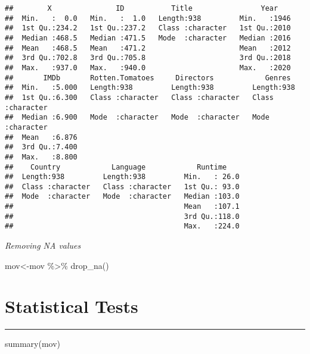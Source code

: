 \documentclass[
]{article}
\newenvironment{Shaded}{\begin{snugshade}}{\end{snugshade}}
\newcommand{\FunctionTok}[1]{\textcolor[rgb]{0.00,0.00,0.00}{#1}}
\newcommand{\NormalTok}[1]{#1}
\newcommand{\OtherTok}[1]{\textcolor[rgb]{0.56,0.35,0.01}{#1}}
\newcommand{\SpecialCharTok}[1]{\textcolor[rgb]{0.00,0.00,0.00}{#1}}
\begin{document}
\begin{verbatim}
##        X               ID           Title                Year     
##  Min.   :  0.0   Min.   :  1.0   Length:938         Min.   :1946  
##  1st Qu.:234.2   1st Qu.:237.2   Class :character   1st Qu.:2010  
##  Median :468.5   Median :471.5   Mode  :character   Median :2016  
##  Mean   :468.5   Mean   :471.2                      Mean   :2012  
##  3rd Qu.:702.8   3rd Qu.:705.8                      3rd Qu.:2018  
##  Max.   :937.0   Max.   :940.0                      Max.   :2020  
##       IMDb       Rotten.Tomatoes     Directors            Genres         
##  Min.   :5.000   Length:938         Length:938         Length:938        
##  1st Qu.:6.300   Class :character   Class :character   Class :character  
##  Median :6.900   Mode  :character   Mode  :character   Mode  :character  
##  Mean   :6.876                                                           
##  3rd Qu.:7.400                                                           
##  Max.   :8.800                                                           
##    Country            Language            Runtime     
##  Length:938         Length:938         Min.   : 26.0  
##  Class :character   Class :character   1st Qu.: 93.0  
##  Mode  :character   Mode  :character   Median :103.0  
##                                        Mean   :107.1  
##                                        3rd Qu.:118.0  
##                                        Max.   :224.0
\end{verbatim}

\emph{Removing NA values}

\begin{Shaded}
\begin{Highlighting}[]
\NormalTok{mov}\OtherTok{\textless{}{-}}\NormalTok{mov }\SpecialCharTok{\%\textgreater{}\%}
  \FunctionTok{drop\_na}\NormalTok{()}
\end{Highlighting}
\end{Shaded}

\hypertarget{stats}{%
\section{\texorpdfstring{\textbf{Statistical
Tests}}{Statistical Tests}}\label{stats}}

\begin{center}\rule{0.5\linewidth}{0.5pt}\end{center}

\begin{Shaded}
\begin{Highlighting}[]
\FunctionTok{summary}\NormalTok{(mov)  }
\end{Highlighting}
\end{Shaded}
\end{document}
